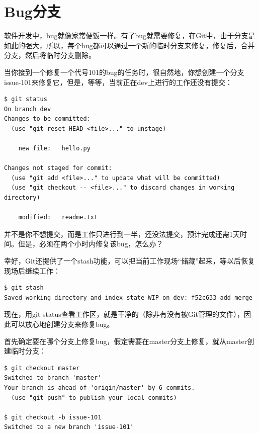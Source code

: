 \section{Bug分支}
软件开发中，bug就像家常便饭一样。有了bug就需要修复，在Git中，由于分支是如此的强大，所以，每个bug都可以通过一个新的临时分支来修复，修复后，合并分支，然后将临时分支删除。

当你接到一个修复一个代号101的bug的任务时，很自然地，你想创建一个分支issue-101来修复它，但是，等等，当前正在dev上进行的工作还没有提交：

\begin{verbatim}
$ git status
On branch dev
Changes to be committed:
  (use "git reset HEAD <file>..." to unstage)

	new file:   hello.py

Changes not staged for commit:
  (use "git add <file>..." to update what will be committed)
  (use "git checkout -- <file>..." to discard changes in working directory)

    modified:   readme.txt
\end{verbatim}

并不是你不想提交，而是工作只进行到一半，还没法提交，预计完成还需1天时间。但是，必须在两个小时内修复该bug，怎么办？

幸好，Git还提供了一个stash功能，可以把当前工作现场“储藏”起来，等以后恢复现场后继续工作：

\begin{verbatim}
$ git stash
Saved working directory and index state WIP on dev: f52c633 add merge
\end{verbatim}

现在，用git status查看工作区，就是干净的（除非有没有被Git管理的文件），因此可以放心地创建分支来修复bug。

首先确定要在哪个分支上修复bug，假定需要在master分支上修复，就从master创建临时分支：

\begin{verbatim}
$ git checkout master
Switched to branch 'master'
Your branch is ahead of 'origin/master' by 6 commits.
  (use "git push" to publish your local commits)

$ git checkout -b issue-101
Switched to a new branch 'issue-101'
\end{verbatim}

